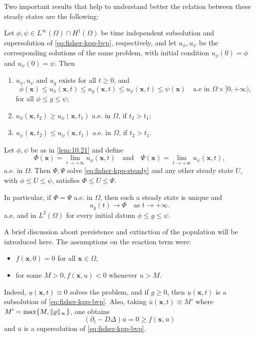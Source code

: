Two important results that help to understand better the relation between these steady states are the following:
\begin{lemma}
    Let \(\phi, \psi \in L^\infty(\Omega) \cap H^1(\Omega)\) be time independent subsolution and supersolution of \eqref{eq:fisher-kpp-bvp}, respectively, and let \(u_\phi, u_\psi\) be the corresponding solutions of the same problem, with initial condition \(u_\phi(0) = \phi\) and \(u_\psi(0) = \psi\). Then
    \begin{enumerate}
        \item \(u_\phi, u_\psi \text{ and } u_g\) exists for all \(t \geq 0\), and 
        \begin{equation}
            \phi(\bm{x}) \leq u_\phi(\bm{x}, t) \leq u_g(\bm{x}, t) \leq u_\psi(\bm{x}, t) \leq \psi(\bm{x}) \quad \text{a.e in } \Omega \times [0, +\infty),
        \end{equation}
        for all \(\phi \leq g \leq \psi\);
        \item \(u_\phi(\bm{x}, t_2) \geq u_\phi(\bm{x}, t_1)\) a.e. in \(\Omega\), if \(t_2 > t_1\);
        \item \(u_\psi(\bm{x}, t_2) \leq u_\psi(\bm{x}, t_1)\) a.e. in \(\Omega\), if \(t_2 > t_1\).
    \end{enumerate}
    \label{lem:10.21}
\end{lemma}
\begin{theorem}
    Let \(\phi, \psi\) be as in \ref{lem:10.21} and define 
    \[
        \Phi(\bm{x}) = \lim_{t \to +\infty} u_\phi(\bm{x}, t) \quad \text{and} \quad \Psi(\bm{x}) = \lim_{t \to +\infty} u_\psi(\bm{x}, t),
    \]
    a.e. in \(\Omega\). Then \(\Phi, \Psi \) solve \eqref{eq:fisher-kpp-steady} and any other steady state \(U\), with \(\phi \leq U \leq \psi\), satisfies \(\Phi \leq U \leq \Psi\).
    
    In particular, if \(\Phi = \Psi\) a.e. in \(\Omega\), then such a steady state is unique and 
    \[
        u_g(t) \to \Phi \quad \text{as } t \to +\infty.
    \]
    a.e. and in \(L^2(\Omega)\) for every initial datum \(\phi \leq g \leq \psi\).
    \label{thm:10.22}
\end{theorem}

A brief discussion about persistence and extinction of the population will be introduced here. 
The assumptions on the reaction term were:
\begin{itemize}
    \item \(f(\bm{x}, 0) = 0\) for all \(\bm{x} \in \Omega\),
    \item for some \(M > 0, f(\bm{x}, u) < 0\) whenever \(u > M\).
\end{itemize}
Indeed, \(\underline{u}(\bm{x}, t) \equiv 0\) solves the problem, and if \(g \geq 0\), then \(\underline{u}(\bm{x}, t)\) is a subsolution of \eqref{eq:fisher-kpp-bvp}. Also, taking \(\overline{u}(\bm{x}, t) \equiv M'\) where \(M' = \max\{M, \lVert g\rVert_\infty\}\), one obtains
\[
    \left(\partial_t - D\Delta\right)\overline{u} = 0 \geq f(\bm{x}, \overline{u}) 
\]
and \(\overline{u}\) is a supersolution of \eqref{eq:fisher-kpp-bvp}. 

